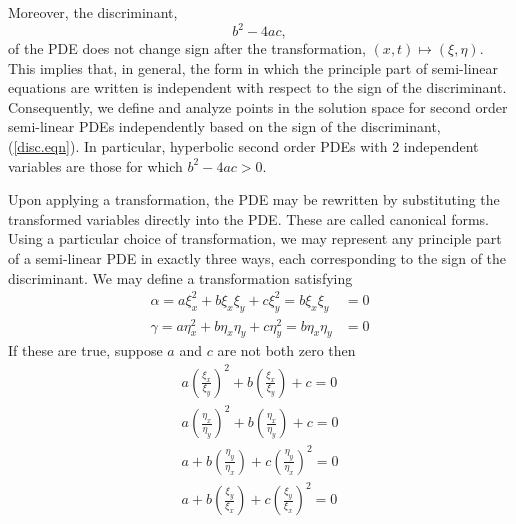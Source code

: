 \documentclass[12pt]{article}
\theoremstyle{definition}
\numberwithin{equation}{section}
\begin{document}
Moreover, the discriminant,
\begin{equation}
b^2-4ac,
\label{disc.eqn}
\end{equation}
of the PDE does not change sign after the transformation, $(x,t)\mapsto (\xi,\eta)$. This implies that, in general, the form in which the principle part of semi-linear equations are written is independent with respect to the sign of the discriminant. Consequently, we define and analyze points in the solution space for second order semi-linear PDEs independently based on the sign of the discriminant, (\ref{disc.eqn}). In particular, hyperbolic second order PDEs with 2 independent variables are those for which $b^2-4ac>0$.

Upon applying a transformation, the PDE may be rewritten by substituting the transformed variables directly into the PDE. These are called canonical forms. Using a particular choice of transformation, we may represent any principle part of a semi-linear PDE in exactly three ways, each corresponding to the sign of the discriminant. We may define a transformation satisfying
\begin{align}
\alpha=a\xi_x^2+b\xi_x\xi_y+c\xi_y^2=b\xi_x\xi_y&=0\label{trans2.eqn}\\
\gamma=a\eta_x^2+b\eta_x\eta_y+c\eta_y^2=b\eta_x\eta_y&=0\label{trans1.eqn}
\end{align}
If these are true, suppose $a$ and $c$ are not both zero then
\begin{gather}
a\left(\frac{\xi_x}{\xi_y}\right)^2+b\left(\frac{\xi_x}{\xi_y}\right)+c=0\nonumber\\a\left(\frac{\eta_x}{\eta_y}\right)^2+b\left(\frac{\eta_x}{\eta_y}\right)+c=0\nonumber\\
a+b\left(\frac{\eta_y}{\eta_x}\right)+c\left(\frac{\eta_y}{\eta_x}\right)^2=0\\ a+b\left(\frac{\xi_y}{\xi_x}\right)+c\left(\frac{\xi_y}{\xi_x}\right)^2=0\nonumber
\end{gather}
\end{document}
